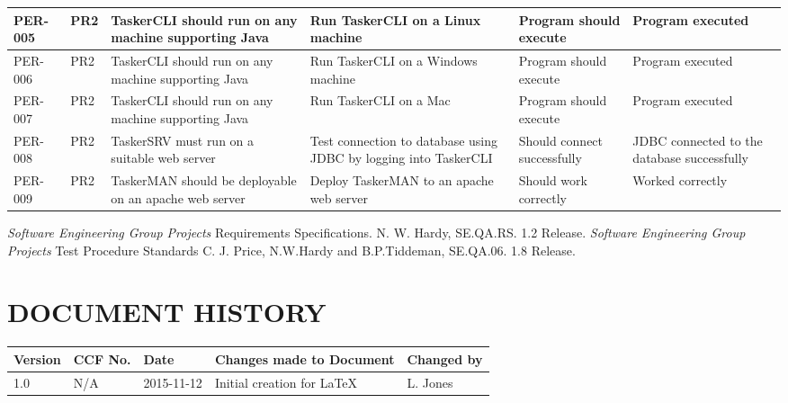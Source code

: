\documentclass{project}
\begin{document}
\begin{longtable}{| p{1.8cm} | p{1.1cm} | p{2.8cm} | p{3.2cm} | p{3.2cm} | p{2.8cm} |}
\hline
PER-005 & PR2 & TaskerCLI should run on any machine supporting Java & Run TaskerCLI on a Linux machine & Program should execute & Program executed \\
\hline
PER-006 & PR2 & TaskerCLI should run on any machine supporting Java & Run TaskerCLI on a Windows machine & Program should execute & Program executed \\
\hline
PER-007 & PR2 & TaskerCLI should run on any machine supporting Java & Run TaskerCLI on a Mac & Program should execute & Program executed \\
\hline
PER-008 & PR2 & TaskerSRV must run on a suitable web server & Test connection to database using JDBC by logging into TaskerCLI & Should connect successfully & JDBC connected to the database successfully \\
\hline
PER-009 & PR2 & TaskerMAN should be deployable on an apache web server & Deploy TaskerMAN to an apache web server & Should work correctly & Worked correctly \\
\hline
\end{longtable}
\clearpage
{}
\begin{thebibliography}{2}
 \emph{Software Engineering Group Projects}
Requirements Specifications.
N. W. Hardy, SE.QA.RS. 1.2 Release.
 \emph{Software Engineering Group Projects}
Test Procedure Standards
C. J. Price, N.W.Hardy and B.P.Tiddeman, SE.QA.06. 1.8 Release.
\end{thebibliography}
\section*{DOCUMENT HISTORY}
\begin{tabular}{|l | l | l | p{8cm} |l | }
\hline
Version & CCF No. & Date & Changes made to Document & Changed by \\
\hline
1.0 & N/A & 2015-11-12 & Initial creation for LaTeX & L. Jones \\
\hline
\end{tabular}
\label{thelastpage}
\end{document}

